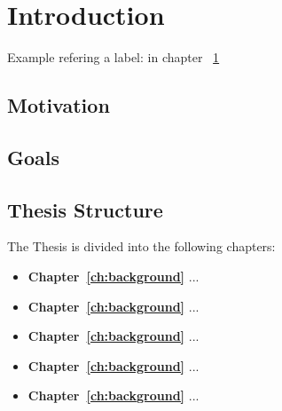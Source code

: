\documentclass[11pt,a4paper]{report}
\begin{document}

\begin{abstract} 
\LaTeX\ bietet Buchdruckqualität für jedermann.
Wir zeigen anhand dieses durch persönliche Präferenzen geprägtes Template, 
wie man Buchdruckqualität für eine Abschlussarbeit einfach erreichen kann.
Dazu werden beispielhaft Lösungen zu üblichen Fragestellungen im Dokument 
vorgestellt.
Zunächst benötigt man ein passendes \LaTeX\ System mit einigen 
installierten Erweiterungspaketen, das es erlaubt das Template zu 
übersetzen. 
Neben den grundlegenden For\-ma\-tie\-rungs\-möglich\-keiten mit \LaTeX\ wird 
insbesondere das Erstellen und Einbinden von Grafiken, Listings und 
mathematischen Formeln gezeigt.
Des Weiteren werden Literatur- und andere Verzeichnisse eingebunden.
Nicht zuletzt finden sich auch sachdienliche Hinweise zum
Schreiben und Zitieren von Literatur.
\end{abstract}

\tableofcontents
\newpage 

\chapter{Introduction} \label{ch:intro}

Example refering a label:   in chapter ~\ref{ch:intro}

\section{Motivation}
\section{Goals}
\section{Thesis Structure}
The Thesis is divided into the following chapters:
\begin{itemize}
	\item \textbf{Chapter~\ref{ch:background}} ...
	\item \textbf{Chapter~\ref{ch:background}} ...
	\item \textbf{Chapter~\ref{ch:background}} ...
	\item \textbf{Chapter~\ref{ch:background}} ...
	\item \textbf{Chapter~\ref{ch:background}} ...
\end{itemize}
\end{document}
